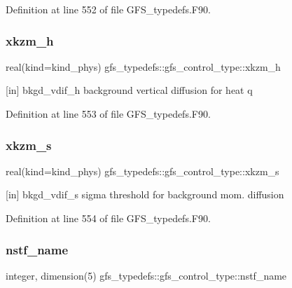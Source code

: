 Definition at line 552 of file G\+F\+S\+\_\+typedefs.\+F90.

\mbox{\label{structgfs__typedefs_1_1gfs__control__type_a3e18f08ee55a9c6b32c026edba3256f2}} 
\subsubsection{xkzm\+\_\+h}
{\footnotesize\ttfamily real(kind=kind\+\_\+phys) gfs\+\_\+typedefs\+::gfs\+\_\+control\+\_\+type\+::xkzm\+\_\+h}



[in] bkgd\+\_\+vdif\+\_\+h background vertical diffusion for heat q 



Definition at line 553 of file G\+F\+S\+\_\+typedefs.\+F90.

\mbox{\label{structgfs__typedefs_1_1gfs__control__type_a4fbdd0dbf8ef7b0bfbf90c264b79f120}} 
\subsubsection{xkzm\+\_\+s}
{\footnotesize\ttfamily real(kind=kind\+\_\+phys) gfs\+\_\+typedefs\+::gfs\+\_\+control\+\_\+type\+::xkzm\+\_\+s}



[in] bkgd\+\_\+vdif\+\_\+s sigma threshold for background mom. diffusion 



Definition at line 554 of file G\+F\+S\+\_\+typedefs.\+F90.

\mbox{\label{structgfs__typedefs_1_1gfs__control__type_a57be51720d1df10dd3d7cd888c232a36}} 
\subsubsection{nstf\+\_\+name}
{\footnotesize\ttfamily integer, dimension(5) gfs\+\_\+typedefs\+::gfs\+\_\+control\+\_\+type\+::nstf\+\_\+name}



